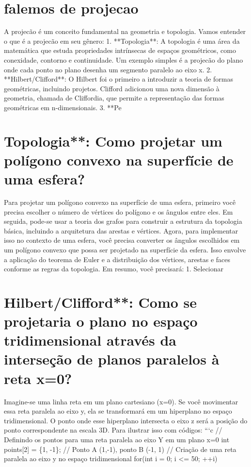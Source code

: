 \documentclass[11pt,a4paper]{article}
\begin{document}
\section{falemos de projecao}
A projecão é um conceito fundamental na geometria e topologia. Vamos entender o que é a projecão em seu gênero: 1. **Topologia**: A topologia é uma área da matemática que estuda propriedades intrínsecas de espaços geométricos, como conexidade, contorno e continuidade. Um exemplo simples é a projecão do plano onde cada ponto no plano desenha um segmento paralelo ao eixo x. 2. **Hilbert/Clifford**: O Hilbert foi o primeiro a introduzir a teoria de formas geométricas, incluindo projetos. Clifford adicionou uma nova dimensão à geometria, chamada de Cliffordia, que permite a representação das formas geométricas em n-dimensionais. 3. **Pe

\section{Topologia**: Como projetar um polígono convexo na superfície de uma esfera?}
Para projetar um polígono convexo na superfície de uma esfera, primeiro você precisa escolher o número de vértices do polígono e os ângulos entre eles. Em seguida, pode-se usar a teoria dos grafos para construir a estrutura da topologia básica, incluindo a arquitetura das arestas e vértices. Agora, para implementar isso no contexto de uma esfera, você precisa converter os ângulos escolhidos em um polígono convexo que possa ser projetado na superfície da esfera. Isso envolve a aplicação do teorema de Euler e a distribuição dos vértices, arestas e faces conforme as regras da topologia. Em resumo, você precisará: 1. Selecionar

\section{Hilbert/Clifford**: Como se projetaria o plano no espaço tridimensional através da interseção de planos paralelos à reta x=0?}
Imagine-se uma linha reta em um plano cartesiano (x=0). Se você movimentar essa reta paralela ao eixo y, ela se transformará em um hiperplano no espaço tridimensional. O ponto onde esse hiperplano intersecta o eixo z será a posição do ponto correspondente na escala 3D. Para ilustrar isso com códigos: ```c // Definindo os pontos para uma reta paralela ao eixo Y em um plano x=0 int points[2] = \{1, -1\}; // Ponto A (1,-1), ponto B (-1, 1) // Criação de uma reta paralela ao eixo y no espaço tridimensional for(int i = 0; i <= 50; ++i)
\end{document}
